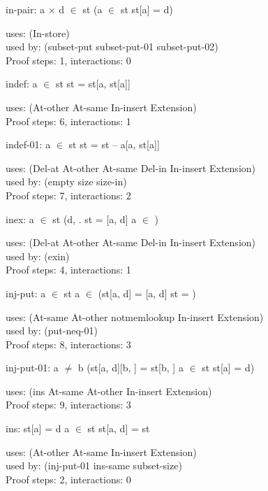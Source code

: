 \documentclass[a4paper]{article}
\begin{document}
\medskip

in-pair: 
 \Fol a $\times$ d $\in$ st \Equiv \Not \Not (a $\in$ st \And st[a] = d)


uses: (In-store)\\
used by: (subset-put subset-put-01 subset-put-02)\\
Proof steps: 1, interactions: 0

\medskip

indef: 
 \Fol a $\in$ st \Equiv st = st[a, st[a]]


uses: (At-other At-same In-insert Extension)\\
Proof steps: 6, interactions: 1

\medskip

indef-01: 
 \Fol a $\in$ st \Equiv st = st -- a[a, st[a]]


uses: (Del-at At-other At-same Del-in In-insert Extension)\\
used by: (empty size size-in)\\
Proof steps: 7, interactions: 2

\medskip

inex: 
 \Fol a $\in$ st \Imp (\Ex d, . st = [a, d] \And \Not a $\in$ )


uses: (Del-at At-other At-same Del-in In-insert Extension)\\
used by: (exin)\\
Proof steps: 4, interactions: 1

\medskip

inj-put: 
 \Fol \Not a $\in$ st \And \Not a $\in$  \Imp (st[a, d] = [a, d] \Equiv st = )


uses: (At-same At-other notmemlookup In-insert Extension)\\
used by: (put-neq-01)\\
Proof steps: 8, interactions: 3

\medskip

inj-put-01: 
 \Fol a $\neq$ b \Imp (st[a, d][b, ] = st[b, ] \Equiv a $\in$ st \And st[a] = d)


uses: (ins At-same At-other In-insert Extension)\\
Proof steps: 9, interactions: 3

\medskip

ins: 
 \Fol st[a] = d \And a $\in$ st \Imp st[a, d] = st


uses: (At-other At-same In-insert Extension)\\
used by: (inj-put-01 ins-same subset-size)\\
Proof steps: 2, interactions: 0
\end{document}
